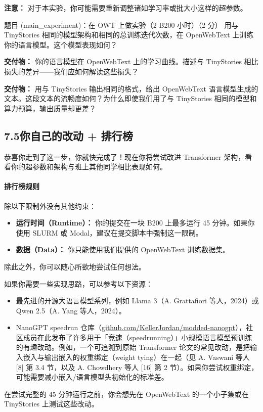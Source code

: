 \noindent\textbf{注意：} 对于本实验，你可能需要重新调整诸如学习率或批大小这样的超参数。

\begin{problembox}{题目 (main\_experiment)：在 OWT 上做实验（2 B200 小时）（2 分）}
用与 TinyStories 相同的模型架构和相同的总训练迭代次数，在 OpenWebText 上训练你的语言模型。这个模型表现如何？

\begin{deliverablebox}
\textbf{交付物：} 你的语言模型在 OpenWebText 上的学习曲线。描述与 TinyStories 相比损失的差异——我们应如何解读这些损失？
\end{deliverablebox}
\begin{deliverablebox}
\textbf{交付物：} 用与 TinyStories 输出相同的格式，给出 OpenWebText 语言模型生成的文本。这段文本的流畅度如何？为什么即使我们用了与 TinyStories 相同的模型和算力预算，输出质量却更差？
\end{deliverablebox}
\end{problembox}

\subsection*{7.5\quad 你自己的改动 + 排行榜}
恭喜你走到了这一步，你就快完成了！现在你将尝试改进 Transformer 架构，看看你的超参数和架构与班上其他同学相比表现如何。

\paragraph{排行榜规则}
除以下限制外没有其他约束：
\begin{itemize}[leftmargin=*]
  \item \textbf{运行时间（Runtime）：} 你的提交在一块 B200 上最多运行 45 分钟。如果你使用 SLURM 或 Modal，建议在提交脚本中强制这一限制。
  \item \textbf{数据（Data）：} 你只能使用我们提供的 OpenWebText 训练数据集。
\end{itemize}
除此之外，你可以随心所欲地尝试任何想法。

如果你需要一些实现思路，可以参考以下资源：
\begin{itemize}[leftmargin=*]
  \item 最先进的开源大语言模型系列，例如 Llama 3（A. Grattafiori 等人，2024）或 Qwen 2.5（A. Yang 等人，2024）。
  \item NanoGPT speedrun 仓库（\url{github.com/KellerJordan/modded-nanogpt}），社区成员在此发布了许多用于「竞速（speedrunning）」小规模语言模型预训练的有趣改动。例如，一个可追溯到原始 Transformer 论文的常见改动，是把输入嵌入与输出嵌入的权重绑定（weight tying）在一起（见 A. Vaswani 等人 [8] 第 3.4 节，以及 A. Chowdhery 等人 [16] 第 2 节）。如果你尝试权重绑定，可能需要减小嵌入/语言模型头初始化的标准差。
\end{itemize}
在尝试完整的 45 分钟运行之前，你会想先在 OpenWebText 的一个小子集或在 TinyStories 上测试这些改动。


